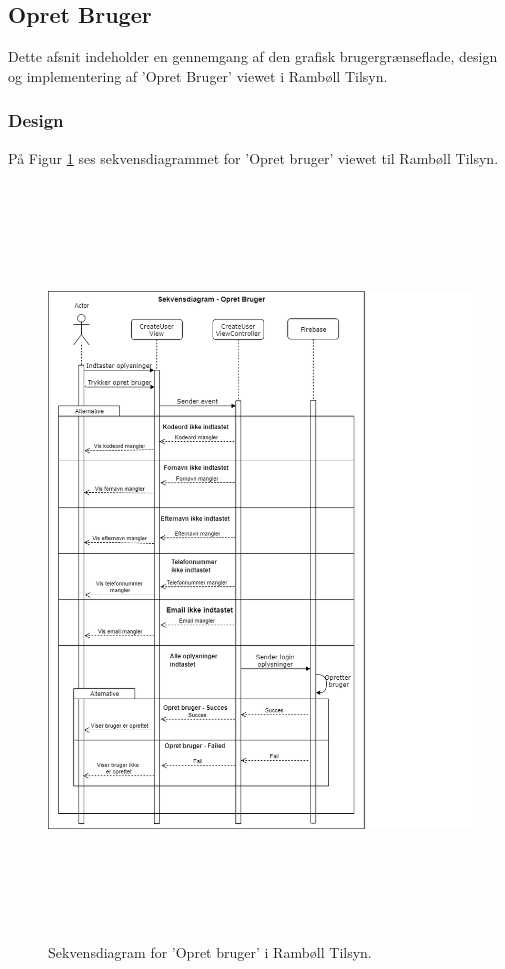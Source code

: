 \subsection{Opret Bruger}\label{sec:Opretbruger}
Dette afsnit indeholder en gennemgang af den grafisk brugergrænseflade, design og implementering af 'Opret Bruger' viewet i Rambøll Tilsyn.

\subsubsection{Design}
På Figur \ref{fig:OpretBrugerSekvens} ses sekvensdiagrammet for 'Opret bruger' viewet til Rambøll Tilsyn.
\begin{figure}[H] %
	\centering
	\includegraphics[height=20cm, width=15cm]{../ArkitekturDesign/Design/OpretBruger/OpretBrugerSekvensDiagram}
	\caption{Sekvensdiagram for 'Opret bruger' i Rambøll Tilsyn.}
	\label{fig:OpretBrugerSekvens}
\end{figure}

